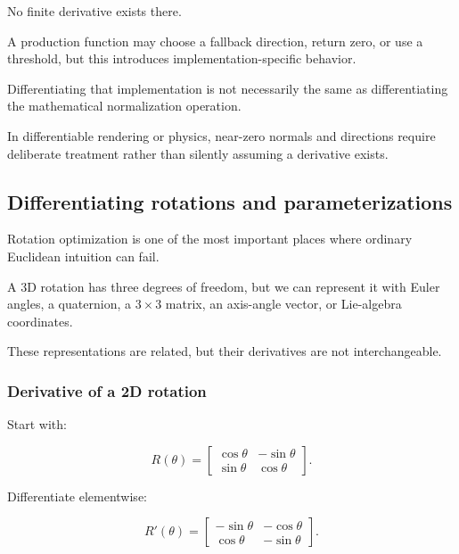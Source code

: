 No finite derivative exists there.

A production  function may choose a fallback direction, return zero, or use a threshold, but this introduces implementation-specific behavior.

Differentiating that implementation is not necessarily the same as differentiating the mathematical normalization operation.

In differentiable rendering or physics, near-zero normals and directions require deliberate treatment rather than silently assuming a derivative exists.

\subsection{Differentiating rotations and parameterizations}\label{02-foundations-ii-ch027-differentiating-rotations-and-parameterizations}

\hypertarget{02-foundations-ii-ch027-differentiating-rotations-and-parameterizations}{}

Rotation optimization is one of the most important places where ordinary Euclidean intuition can fail.

A 3D rotation has three degrees of freedom, but we can represent it with Euler angles, a quaternion, a \(3\times3\) matrix, an axis-angle vector, or Lie-algebra coordinates.

These representations are related, but their derivatives are not interchangeable.

\subsubsection{Derivative of a 2D rotation}\label{02-foundations-ii-ch027-derivative-of-a-2d-rotation}

\hypertarget{02-foundations-ii-ch027-derivative-of-a-2d-rotation}{}

Start with:

\[
R(\theta)= \begin{bmatrix} \cos\theta&-\sin\theta\\ \sin\theta&\cos\theta \end{bmatrix}.
\]

Differentiate elementwise:

\[
\boxed{ R'(\theta)= \begin{bmatrix} -\sin\theta&-\cos\theta\\ \cos\theta&-\sin\theta \end{bmatrix} }.
\]


